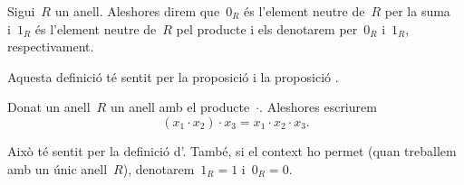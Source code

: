 \documentclass[../../main.tex]{subfiles}
\begin{document}
    \begin{definition}
        \label{def:l'element neutre d'un anell per la suma}
        \label{def:l'element neutre d'un anell pel producte}
        Sigui~\(R\) un anell.
        Aleshores direm que~\(0_{R}\) és l'element neutre de~\(R\) per la suma i~\(1_{R}\) és l'element neutre de~\(R\) pel producte i els denotarem per~\(0_{R}\) i~\(1_{R}\), respectivament.

        Aquesta definició té sentit per la proposició  i la proposició .
    \end{definition}
    \begin{notation}
        Donat un anell~\(R\) un anell amb el producte~\(\cdot\).
        Aleshores escriurem
        \[
            (x_{1}\cdot x_{2})\cdot x_{3}=x_{1}\cdot x_{2}\cdot x_{3}.
        \]

        Això té sentit per la definició d'.
        També, si el context ho permet (quan treballem amb un únic anell~\(R\)), denotarem~\(1_{R}=1\) i~\(0_{R}=0\).
    \end{notation}
\end{document}
